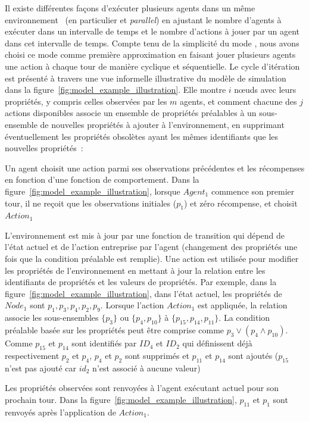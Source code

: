 Il existe différentes façons d'exécuter plusieurs agents dans un même environnement~\cite{terry2020pettingzoo} (en particulier  et \textit{parallel}) en ajustant le nombre d'agents à exécuter dans un intervalle de temps et le nombre d'actions à jouer par un agent dans cet intervalle de temps. Compte tenu de la simplicité du mode , nous avons choisi ce mode comme première approximation en faisant jouer plusieurs agents une action à chaque tour de manière cyclique et séquentielle. Le cycle d'itération est présenté à travers une vue informelle illustrative du modèle de simulation dans la figure~\ref{fig:model_example_illustration}. Elle montre $i$ nœuds avec leurs propriétés, y compris celles observées par les $m$ agents, et comment chacune des $j$ actions disponibles associe un ensemble de propriétés préalables à un sous-ensemble de nouvelles propriétés à ajouter à l'environnement, en supprimant éventuellement les propriétés obsolètes ayant les mêmes identifiants que les nouvelles propriétés~: \begin{enumerate*}[label=\arabic*),itemjoin={;\quad}]
  \item Un agent choisit une action parmi ses observations précédentes et les récompenses en fonction d'une fonction de comportement. Dans la figure~\ref{fig:model_example_illustration}, lorsque $Agent_1$ commence son premier tour, il ne reçoit que les observations initiales ($p_{1}$) et zéro récompense, et choisit $Action_1$



  \item L'environnement est mis à jour par une fonction de transition qui dépend de l'état actuel et de l'action entreprise par l'agent (changement des propriétés une fois que la condition préalable est remplie). Une action est utilisée pour modifier les propriétés de l'environnement en mettant à jour la relation entre les identifiants de propriétés et les valeurs de propriétés.
  Par exemple, dans la figure~\ref{fig:model_example_illustration}, dans l'état actuel, les propriétés de $Node_1$ sont $p_1,p_3,p_4,p_2,p_9$. Lorsque l'action $Action_1$ est appliquée, la relation associe les sous-ensembles $\{p_3\}$ ou $\{p_4, \allowbreak p_{10}\}$ à $\{p_{15}, \allowbreak p_{14}, \allowbreak p_{11}\}$. La condition préalable basée sur les propriétés peut être comprise comme $p_3 \lor (p_4 \land p_{10})$. Comme $p_{15}$ et $p_{14}$ sont identifiés par $ID_4$ et $ID_2$ qui définissent déjà respectivement $p_{2}$ et $p_{4}$, $p_{4}$ et $p_{2}$ sont supprimés et $p_{11}$ et $p_{14}$ sont ajoutés ($p_{15}$ n'est pas ajouté car $id_2$ n'est associé à aucune valeur)



  \item Les propriétés observées sont renvoyées à l'agent exécutant actuel pour son prochain tour. Dans la figure~\ref{fig:model_example_illustration}, $p_{11}$ et $p_1$ sont renvoyés après l'application de $Action_1$.

\end{enumerate*}

